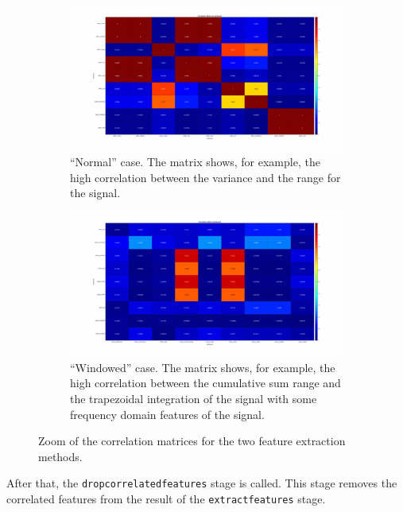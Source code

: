 \begin{figure}[!htb]
	\centering
	\begin{subfigure}{\textwidth}
		\includegraphics[width=\textwidth, trim=2.2cm 1.05cm 2.2cm 0.8cm, clip]{img/corrmatrixzoomnormal}
		\caption{``Normal'' case. The matrix shows, for example, the
		high correlation between the variance and the range for the
		 signal.}\label{fig:corrmatrixzoomnormal}
	\end{subfigure}
	\begin{subfigure}{\textwidth}
		\includegraphics[width=\textwidth, trim=2.2cm 1.05cm 2.2cm 0.8cm, clip]{img/corrmatrixzoomwindowed}
		\caption{``Windowed'' case. The matrix shows, for example, the
		high correlation between the cumulative sum range and the
		trapezoidal integration of the  signal with some
		frequency domain features of the 
		signal.}\label{fig:corrmatrixzoomwindowed}
	\end{subfigure}
	\caption{Zoom of the correlation matrices for the two feature
	extraction methods.}\label{fig:corrmatrixzoom}
\end{figure}

After that, the \texttt{dropcorrelatedfeatures} stage is called. This stage
removes the correlated features from the result of the \texttt{extractfeatures}
stage. 


